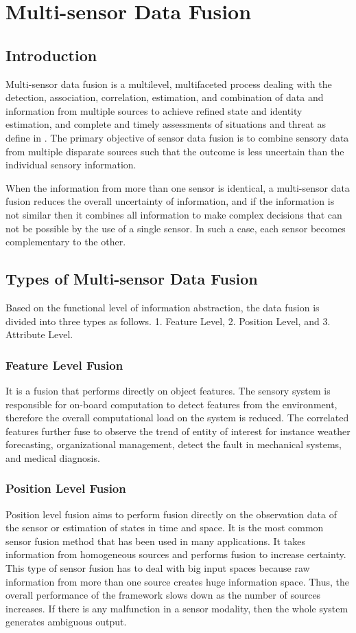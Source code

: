 \chapter{Multi-sensor Data Fusion}
\label{ch:Sensor Fusion}

\section{Introduction}
Multi-sensor data fusion is a multilevel, multifaceted process dealing with the detection, association, correlation, estimation, and combination of data and information from multiple sources to achieve refined state and identity estimation, and complete and timely assessments of situations and threat as define in \cite{Edward}. The primary objective of sensor data fusion is to combine sensory data from multiple disparate sources such that the outcome is less uncertain than the individual sensory information. 

When the information from more than one sensor is identical, a multi-sensor data fusion reduces the overall uncertainty of information, and if the information is not similar then it combines all information to make complex decisions that can not be possible by the use of a single sensor. In such a case, each sensor becomes complementary to the other.

\section{Types of Multi-sensor Data Fusion}
Based on the functional level of information abstraction, the data fusion is divided into three types as follows. 1. Feature Level, 2. Position Level, and 3. Attribute Level.  

\subsection{Feature Level Fusion}
It is a fusion that performs directly on object features. The sensory system is responsible for on-board computation to detect features from the environment, therefore the overall computational load on the system is reduced. The correlated features further fuse to observe the trend of entity of interest for instance weather forecasting, organizational management, detect the fault in mechanical systems, and medical diagnosis.
 
\subsection{Position Level Fusion}
Position level fusion aims to perform fusion directly on the observation data of the sensor or estimation of states in time and space. It is the most common sensor fusion method that has been used in many applications. It takes information from homogeneous sources and performs fusion to increase certainty. This type of sensor fusion has to deal with big input spaces because raw information from more than one source creates huge information space. Thus, the overall performance of the framework slows down as the number of sources increases. If there is any malfunction in a sensor modality, then the whole system generates ambiguous output.

